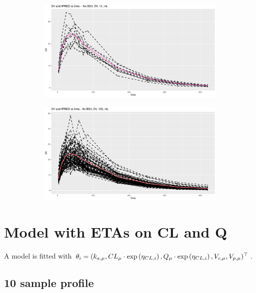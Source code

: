 \begin{figure}[htbp]
    \begin{subfigure}[b]{0.49\linewidth}
        \centering
        \includegraphics[width=\linewidth]{fig/img/Xpose/nobsv/dv_and_ipred_vs_time_10_nls_plot.pdf}
        \caption{}
        \label{fig:}
    \end{subfigure}
    \hfill
    \begin{subfigure}[b]{0.49\linewidth}
        \centering
        \includegraphics[width=\linewidth]{fig/img/Xpose/nobsv/dv_and_ipred_vs_time_100_nls_plot.pdf}
        \caption{}
        \label{fig:}
    \end{subfigure}
\end{figure}

\section{Model with ETAs on CL and Q}
A model is fitted with $\theta_i = (k_{a,\mu}, CL_{\mu}\cdot \text{exp}\left({\eta_{CL,i}}\right), Q_{\mu}\cdot \text{exp}\left({\eta_{CL,i}}\right),V_{c,\mu},V_{p,\mu})^\top$.

\subsection{10 sample profile}

